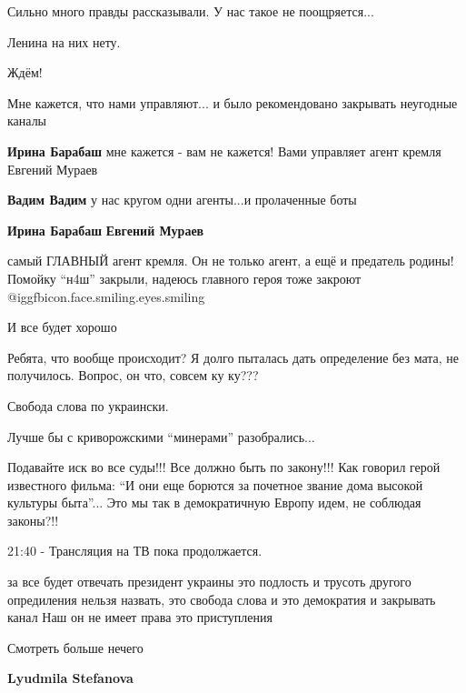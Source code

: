 \begin{itemize}
Сильно много правды рассказывали. У нас такое не поощряется...

Ленина на них нету.

Ждём!

Мне кажется, что нами управляют... и было рекомендовано закрывать неугодные каналы

\begin{itemize} %
\textbf{Ирина Барабаш} мне кажется - вам не кажется! Вами управляет агент кремля Евгений Мураев

\textbf{Вадим Вадим} у нас кругом одни агенты...и пролаченные боты

\textbf{Ирина Барабаш} \textbf{Евгений Мураев} 

самый ГЛАВНЫЙ агент кремля. Он не только агент, а ещё и предатель родины!
Помойку \enquote{н4ш} закрыли, надеюсь главного героя тоже закроют
@igg{fbicon.face.smiling.eyes.smiling}

И все будет хорошо

\end{itemize} %


Ребята, что вообще происходит? Я долго пыталась дать определение без мата, не
получилось. Вопрос, он что, совсем ку ку???

Свобода слова по украински.

Лучше бы с криворожскими \enquote{минерами} разобрались...


Подавайте иск во все суды!!! Все должно быть по закону!!! Как говорил герой
известного фильма: \enquote{И они еще борются за почетное звание дома высокой культуры
быта}... Это мы так в демократичную Европу идем, не соблюдая законы?!!

21:40 - Трансляция на ТВ пока продолжается.


за все будет отвечать президент украины это подлость и трусоть другого
опредиления нельзя назвать, это свобода слова и это демократия и закрывать
канал Наш он не имеет права это приступления

Смотреть больше нечего

\begin{itemize} %
\textbf{Lyudmila Stefanova} 


\end{itemize}
\end{itemize}
